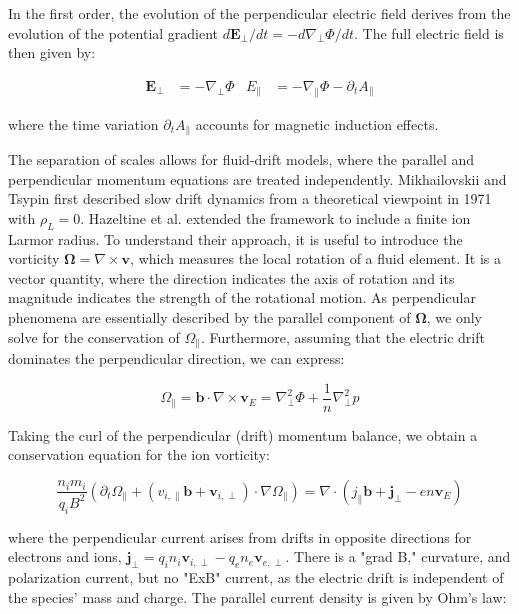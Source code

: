 	In the first order, the evolution of the perpendicular electric field derives from the evolution of the potential gradient $d\mathbf{E}_\perp / dt = -d\nabla_\perp \Phi / dt$. The full electric field is then given by:

\begin{align}
	\mathbf{E}_\perp &= -\nabla_\perp \Phi &
	E_\parallel &= -\nabla_\parallel \Phi - \partial_t A_\parallel
\end{align}

where the time variation $\partial_t A_\parallel$ accounts for magnetic induction effects.

The separation of scales allows for fluid-drift models, where the parallel and perpendicular momentum equations are treated independently. Mikhailovskii and Tsypin\cite{mikhailovskii1971transport} first described slow drift dynamics from a theoretical viewpoint in 1971 with $\rho_L = 0$. Hazeltine et al.\cite{hazeltine1985four} extended the framework to include a finite ion Larmor radius. To understand their approach, it is useful to introduce the vorticity $ \boldsymbol{\Omega} = \nabla \times \mathbf{v}$, which measures the local rotation of a fluid element. It is a vector quantity, where the direction indicates the axis of rotation and its magnitude indicates the strength of the rotational motion. As perpendicular phenomena are essentially described by the parallel component of $\boldsymbol{\Omega}$, we only solve for the conservation of $\Omega_\parallel$. Furthermore, assuming that the electric drift dominates the perpendicular direction, we can express:

\begin{equation}
	\Omega_\parallel = \mathbf{b} \cdot \nabla \times \mathbf{v}_E = \nabla_\perp^2 \Phi + \frac{1}{n}\nabla_\perp^2 p
\end{equation}

Taking the curl of the perpendicular (drift) momentum balance, we obtain a conservation equation for the ion vorticity:

\begin{equation}
	\label{eq:edge_vorticityConservation}
	\frac{n_im_i}{q_iB^2}\left(\partial_t\Omega_\parallel + (v_{i,\parallel}\mathbf{b} + \mathbf{v}_{i,\perp})\cdot\nabla\Omega_\parallel\right) = \nabla \cdot \left(j_\parallel\mathbf{b} + \mathbf{j}_\perp - en\mathbf{v}_E\right)
\end{equation}

where the perpendicular current arises from drifts in opposite directions for electrons and ions, $\mathbf{j}_\perp = q_i n_i \mathbf{v}_{i,\perp} - q_e n_e \mathbf{v}_{e,\perp}$. There is a "grad B," curvature, and polarization current, but no "ExB" current, as the electric drift is independent of the species' mass and charge. The parallel current density is given by Ohm's law:

